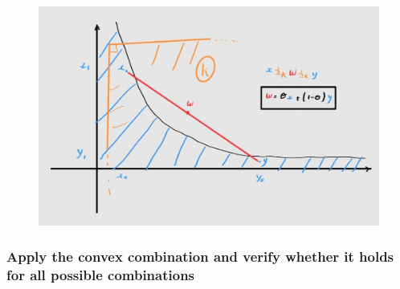 \documentclass{article}
\begin{document}
\begin{figure}[H]
	\centering
	\includegraphics[scale = 0.2]{figs/2.8_set.png}
\end{figure}

\subsubsection{Apply the convex combination and verify whether it holds for all possible combinations}
\end{document}
